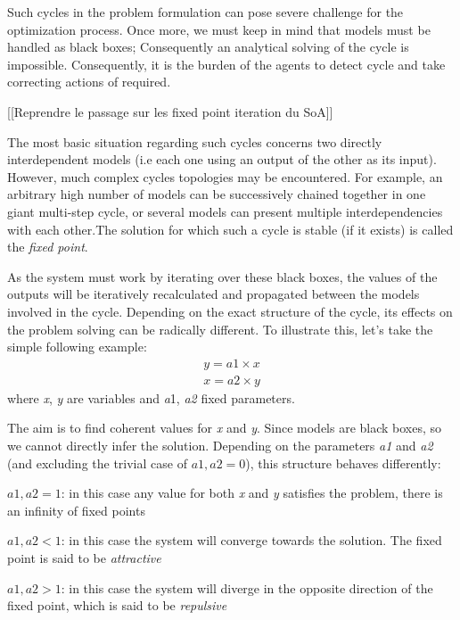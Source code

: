Such cycles in the problem formulation can pose severe challenge for the optimization process. Once more, we must keep in mind that models must be handled as black boxes; Consequently an analytical solving of the cycle is impossible. Consequently, it is the burden of the agents to detect cycle and take correcting actions of required.

[[Reprendre le passage sur les fixed point iteration du SoA]]

The most basic situation regarding such cycles concerns two directly interdependent models (i.e each one using an output of the other as its input). However, much complex cycles topologies may be encountered. For example, an arbitrary high number of models can be successively chained together in one giant multi-step cycle, or several models can present multiple interdependencies with each other.The solution for which such a cycle is stable (if it exists) is called the \emph{fixed point}.

As the system must work by iterating over these black boxes, the values of the outputs will be iteratively recalculated and propagated between the models involved in the cycle. Depending on the exact structure of the cycle, its effects on the problem solving can be radically different. To illustrate this, let's take the simple following example:
\begin{gather*}
y = a1 \times x \\
x = a2 \times y
\end{gather*}
where \emph{x}, \emph{y} are variables and \emph{a}1, \emph{a2} fixed parameters.
 
The aim is to find coherent values for \emph{x} and \emph{y}. Since models are black boxes, so we cannot directly infer the solution. Depending on the parameters \emph{a1} and \emph{a2} (and excluding the trivial case of \(a1, a2  = 0\)), this structure behaves differently: 
 
\begin{compactitem}
\item \(a1, a2 = 1\): in this case any value for both \emph{x} and \emph{y} satisfies the problem, there is an infinity of fixed points
\item \(a1, a2 < 1\): in this case the system will converge towards the solution. The fixed point is said to be \emph{attractive}
\item \(a1, a2 > 1\): in this case the system will diverge in the opposite direction of the fixed point, which is said to be \emph{repulsive}
\end{compactitem}

